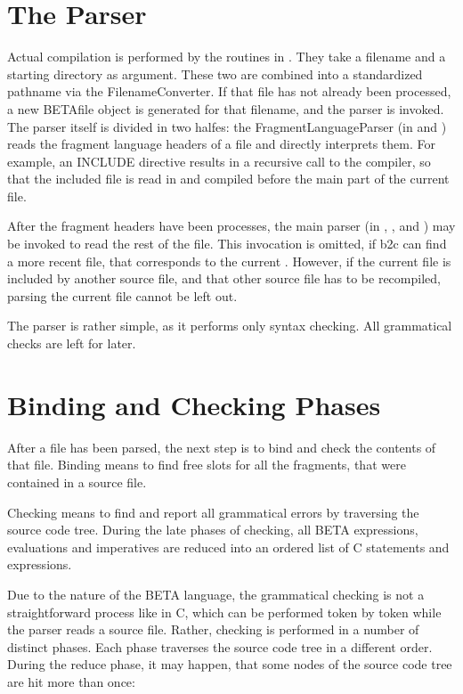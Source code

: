 \section{The Parser}
Actual compilation is performed by the routines in
.  They take a filename and a starting directory
as argument.  These two are combined into a standardized pathname
via the FilenameConverter.  If that file has not already been
processed, a new BETAfile object is generated for that filename,
and the parser is invoked.  The parser itself is divided in two
halfes: the FragmentLanguageParser (in  and
) reads the fragment language headers of a
file and directly interprets them.  For example, an INCLUDE
directive results in a recursive call to the compiler, so that
the included file is read in and compiled before the main part of
the current file.

After the fragment headers have been processes, the main parser
(in , ,  and
) may be invoked to read the rest of the file.  This
invocation is omitted, if b2c can find a more recent 
file, that corresponds to the current .  However, if
the current file is included by another source file, and that
other source file has to be recompiled, parsing the current
file cannot be left out.

The parser is rather simple, as it performs only syntax checking.
All grammatical checks are left for later.

\section{Binding and Checking Phases}
\label{check}
\label{check-phase3}
After a file has been parsed, the next step is to bind and
check the contents of that file.  Binding means to find free
slots for all the fragments, that were contained in a source
file.

Checking means to find and report all grammatical errors by
traversing the source code tree.  During the late phases of
checking, all BETA expressions, evaluations and imperatives are
reduced into an ordered list of C statements and expressions.

Due to the nature of the BETA language, the grammatical checking
is not a straightforward process like in C, which can be
performed token by token while the parser reads a source file.
Rather, checking is performed in a number of distinct phases.
Each phase traverses the source code tree in a different order.
During the reduce phase, it may happen, that some nodes of the
source code tree are hit more than once:

